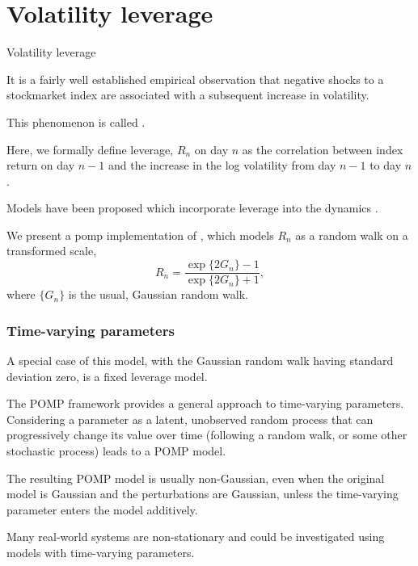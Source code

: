 \section{Volatility leverage}

\begin{frame}[fragile]{Volatility leverage}

\bi

\item It is a fairly well established empirical observation that negative shocks to a stockmarket index are associated with a subsequent increase in volatility. 

\item This phenomenon is called .

\item Here, we formally define leverage, $R_n$ on day $n$ as the correlation between index return on day $n-1$ and the increase in the log volatility from day $n-1$ to day $n$.

\item Models have been proposed which incorporate leverage into the dynamics \citep{breto14}.

\item We present a pomp implementation of \citet{breto14}, which models $R_n$ as a random walk on a transformed scale,
$$R_n= \frac{\exp\{2G_n\} -1}{\exp\{2G_n\}+1},$$
where $\{G_n\}$ is the usual, Gaussian random walk.

\ei

\end{frame}

\begin{frame}[fragile]


\frametitle{Time-varying parameters}

\bi

\item A special case of this model, with the Gaussian random walk having standard deviation zero, is a fixed leverage model.

\item The POMP framework provides a general approach to time-varying parameters. Considering a parameter as a latent, unobserved random process that can progressively change its value over time (following a random walk, or some other stochastic process) leads to a POMP model.

\item The resulting POMP model is usually non-Gaussian, even when the original model is Gaussian and the perturbations are Gaussian, unless the time-varying parameter enters the model additively.

\item Many real-world systems are non-stationary and could be investigated using models with time-varying parameters. 

\ei

\end{frame}

